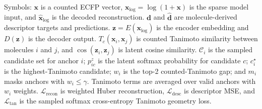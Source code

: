 \documentclass[border=0pt]{standalone}
\begin{document}
\color[HTML]{64748B}
\sffamily\fontsize{9}{11}\selectfont
\setlength{\parindent}{0pt}
\begin{minipage}{315mm}
Symbols: $\mathbf{x}$ is a counted ECFP vector, $\mathbf{x}_{\log}=\log(1+\mathbf{x})$ is the sparse model input, and $\widehat{\mathbf{x}}_{\log}$ is the decoded reconstruction. $\mathbf{d}$ and $\widehat{\mathbf{d}}$ are molecule-derived descriptor targets and predictions. $\mathbf{z}=E(\mathbf{x}_{\log})$ is the encoder embedding and $D(\mathbf{z})$ is the decoder output. $T_c(\mathbf{x}_i,\mathbf{x}_j)$ is counted Tanimoto similarity between molecules $i$ and $j$, and $\cos(\mathbf{z}_i,\mathbf{z}_j)$ is latent cosine similarity. $\mathcal{C}_i$ is the sampled candidate set for anchor $i$; $p^z_{ic}$ is the latent softmax probability for candidate $c$; $c_i^\star$ is the highest-Tanimoto candidate; $w_i$ is the top-2 counted-Tanimoto gap; and $m_i$ masks anchors with $w_i\le\gamma$. Tanimoto terms are averaged over valid anchors with $w_i$ weights. $\mathcal{L}_{\mathrm{recon}}$ is weighted Huber reconstruction, $\mathcal{L}_{\mathrm{desc}}$ is descriptor MSE, and $\mathcal{L}_{\mathrm{tan}}$ is the sampled softmax cross-entropy Tanimoto geometry loss.
\end{minipage}
\end{document}
